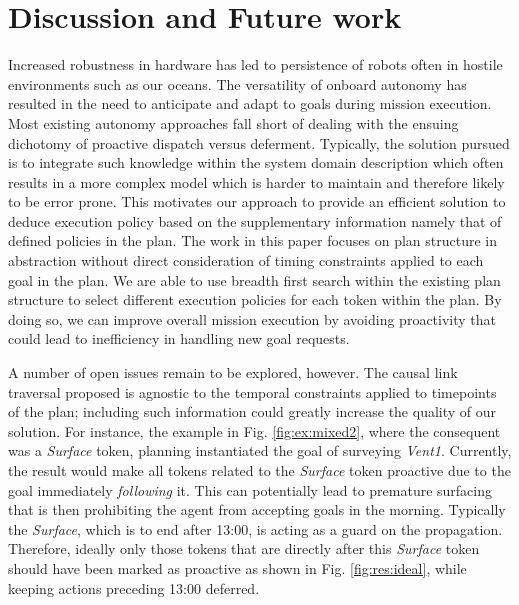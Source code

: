 \section{Discussion and Future work}
\label{sec:conclude}

Increased robustness in hardware has led to persistence of robots
often in hostile environments such as our oceans. The versatility of
onboard autonomy has resulted in the need to anticipate and adapt to
goals during mission execution.  Most existing autonomy approaches
fall short of dealing with the ensuing dichotomy of proactive dispatch
versus deferment.  Typically, the solution pursued is to integrate
such knowledge within the system domain description which often
results in a more complex model which is harder to maintain and
therefore likely to be error prone.  This motivates our approach to
provide an efficient solution to deduce execution policy based on the
supplementary information namely that of defined policies in the plan.  The work
in this paper focuses on plan structure in abstraction without direct
consideration of timing constraints applied to each goal in the
plan. We are able to use breadth first search within the
existing plan structure to select different execution policies for
each token within the plan. By doing so, we can improve overall
mission execution by avoiding proactivity that could lead to
inefficiency in handling new goal requests.

A number of open issues remain to be explored, however. The causal
link traversal proposed is agnostic to the temporal constraints
applied to timepoints of the plan; including such information could
greatly increase the quality of our solution.  
For instance, the example in Fig. \ref{fig:ex:mixed2}, where the consequent
was a {\em Surface} token, planning instantiated the
goal of surveying \emph{Vent1}. Currently, the result would
make all tokens related to the {\em Surface} token
proactive due to the goal immediately \emph{following}
it.
This can potentially lead to premature surfacing that is then
prohibiting the agent from accepting goals in the morning. Typically
the {\em Surface}, which is to end after 13:00, is acting
as a guard on the propagation.
Therefore, ideally only those tokens that are directly after this
{\em Surface} token should have been marked as proactive as shown in
Fig. \ref{fig:res:ideal}, while keeping actions preceding 13:00 deferred.

